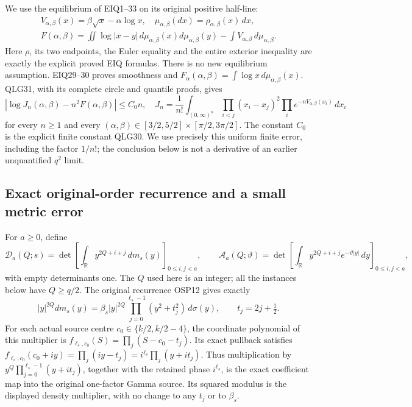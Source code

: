 \documentclass[11pt,a4paper]{article}
\begin{document}
We use the equilibrium of EIQ1--33 on its original positive half-line:
\[
\begin{gathered}
V_{\alpha,\beta}(x)=\beta\sqrt{x}-\alpha\log x,\quad
\mu_{\alpha,\beta}(dx)=\rho_{\alpha,\beta}(x)\,dx,\\
F(\alpha,\beta)=
\iint\log|x-y|\,d\mu_{\alpha,\beta}(x)d\mu_{\alpha,\beta}(y)
-\int V_{\alpha,\beta}\,d\mu_{\alpha,\beta}.
\end{gathered}
\tag{OFV2}
\]
Here $\rho$, its two endpoints, the Euler equality and the entire
exterior inequality are exactly the explicit proved EIQ formulas.
There is no new equilibrium assumption. EIQ29--30 proves smoothness
and
$F_\alpha(\alpha,\beta)=\int\log x\,d\mu_{\alpha,\beta}(x)$.
QLG31, with its complete circle and quantile proofs, gives
\[
\left|\log J_n(\alpha,\beta)-n^2F(\alpha,\beta)\right|\le C_0n,
\quad
J_n=\frac1{n!}\int_{(0,\infty)^n}
\prod_{i<j}(x_i-x_j)^2
\prod_i e^{-nV_{\alpha,\beta}(x_i)}\,dx_i
\tag{OFV3}
\]
for every $n\ge1$ and every
$(\alpha,\beta)\in[3/2,5/2]\times[\pi/2,3\pi/2]$.
The constant $C_0$ is the explicit finite constant QLG30.
We use precisely this uniform finite error, including the factor
$1/n!$; the conclusion below is not a derivative of an earlier
unquantified $q^2$ limit.

\subsection{Exact original-order recurrence and a small metric error}

For $a\ge0$, define
\[
\mathcal D_a(Q;s)
=\det\left[\int_{\mathbb R}y^{2Q+i+j}\,dm_s(y)\right]_{0\le i,j<a},
\qquad
\mathcal A_a(Q;\vartheta)
=\det\left[\int_{\mathbb R}y^{2Q+i+j}e^{-\vartheta|y|}\,dy
                                      \right]_{0\le i,j<a},
\tag{OFV4}
\]
with empty determinants one. The $Q$ used here is an integer;
all the instances below have $Q\ge q/2$.
The original recurrence OSP12 gives exactly
\[
|y|^{2Q}dm_s(y)=
\beta_s |y|^{2Q}
\prod_{j=0}^{\ell_s-1}(y^2+t_j^2)\,d\sigma(y),
\qquad t_j=2j+\tfrac12.
\tag{OFV5}
\]
For each actual source centre $c_0\in\{k/2,k/2-4\}$, the
coordinate polynomial of this multiplier is
$f_{\ell_s,c_0}(S)=\prod_j(S-c_0-t_j)$.
Its exact pullback satisfies
$f_{\ell_s,c_0}(c_0+iy)=\prod_j(iy-t_j)
=i^{\ell_s}\prod_j(y+it_j)$.
Thus multiplication by
$y^Q\prod_{j=0}^{\ell_s-1}(y+it_j)$, together with the
retained phase $i^{\ell_s}$, is the exact coefficient map
into the original one-factor Gamma source. Its squared modulus
is the displayed density multiplier, with no change to any $t_j$
or to $\beta_s$.
\end{document}
